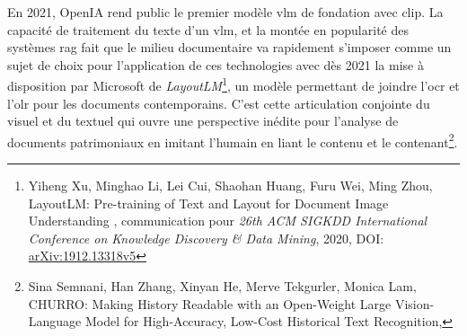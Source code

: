 En 2021, OpenIA rend public le premier modèle \gls{vlm} de fondation  avec  \gls{clip}. La capacité de traitement du texte d'un \gls{vlm}, et la montée en popularité des systèmes \gls{rag} fait que le milieu documentaire va rapidement s'imposer comme un sujet de choix pour l'application de ces technologies avec dès 2021 la mise à disposition par Microsoft de \textit{LayoutLM}\footnote{Yiheng Xu, Minghao Li, Lei Cui, Shaohan Huang, Furu Wei, Ming Zhou, \og LayoutLM: Pre-training of Text and Layout for Document Image Understanding \fg, communication pour \textit{26th ACM SIGKDD International Conference on Knowledge Discovery \& Data Mining}, 2020, DOI: \href{arXiv:1912.13318v5}{arXiv:1912.13318v5}}, un modèle permettant de joindre l'\gls{ocr} et l'\gls{olr} pour les documents contemporains. C'est cette articulation conjointe du visuel et du textuel qui ouvre une perspective inédite pour l'analyse de documents patrimoniaux en imitant l'humain en liant le contenu et le contenant\footnote{Sina Semnani, Han Zhang, Xinyan He, Merve Tekgurler, Monica Lam, \og CHURRO: Making History Readable with an Open-Weight Large Vision-Language Model for High-Accuracy, Low-Cost Historical Text Recognition\fg,}. 

